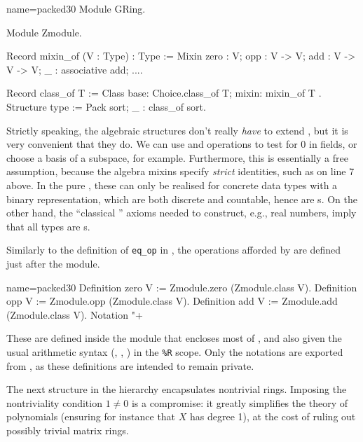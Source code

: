 \begin{coq}{name=packed30}{}
Module GRing.
  
Module Zmodule.

Record mixin_of (V : Type) : Type := Mixin {
  zero : V; opp : V -> V; add : V -> V -> V;
  _ : associative add;
  ...}.

Record class_of T := Class { base: Choice.class_of T; mixin: mixin_of T }.
Structure type := Pack {sort; _ : class_of sort}.
\end{coq}

Strictly speaking, the \mcbMC{} algebraic structures don't really
\emph{have} to extend , but it is very convenient that
they do.  We can use  and  operations to test
for 0 in fields, or choose a basis of a subspace, for example.
Furthermore, this is essentially a free assumption, because the
\mcbMC{} algebra mixins specify \emph{strict} identities, such as
 on line 7 above. In the pure \mcbCIC{}, these can only
be realised for concrete data types with a binary representation,
which are both discrete and countable, hence are s.  On
the other hand, the ``classical \mcbCIC{}'' axioms needed to construct,
e.g., real numbers, imply that all types are s.

Similarly to the definition of \lstinline/eq_op/ in , the
operations afforded by  are defined just after the
 module.

\begin{coq}{name=packed30}{}
Definition zero V := Zmodule.zero (Zmodule.class V).
Definition opp V := Zmodule.opp (Zmodule.class V).
Definition add V := Zmodule.add (Zmodule.class V).
Notation "+%
\end{coq}

These are defined inside the  module that encloses most of
, and also given the usual arithmetic syntax (,
, ) in the \lstinline/%R/
scope. Only the notations are
exported from , as these definitions are intended to remain
private.


The next structure in the hierarchy encapsulates nontrivial rings.
Imposing the nontriviality condition $1 \neq 0$ is a compromise:
it greatly simplifies the theory of polynomials (ensuring for instance that
$X$ has degree 1), at the cost of ruling out possibly trivial matrix rings.

